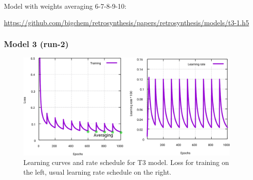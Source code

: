 \documentclass{article}
\begin{document}
Model with weights averaging 6-7-8-9-10:

\url{https://github.com/bigchem/retrosynthesis/papers/retrosynthesis/models/t3-1.h5}

\newpage
 
\subsubsection{Model 3 (run-2)}
 
\begin{figure}[h!]
  \centering
  \includegraphics[width = 16.5cm]{images/t3-2.pdf}
  \caption{Learning curves and rate schedule for T3 model. Loss for training on the left, usual learning rate schedule on the right.}
  \label{fig:t11}
\end{figure}
\end{document}
